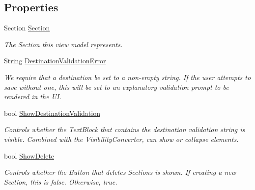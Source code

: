 \subsection*{Properties}
\begin{DoxyCompactItemize}
\item 
Section \mbox{\hyperlink{class_listen_to_me_1_1_view_model_1_1_section_view_model_ac1ac47e03f46b5fe9945f66cfbb03fa7}{Section}}
\begin{DoxyCompactList}\small\item\em The Section this view model represents. \end{DoxyCompactList}\item 
String \mbox{\hyperlink{class_listen_to_me_1_1_view_model_1_1_section_view_model_a6cd72ba0cad2236b996d642a70b22bfa}{Destination\+Validation\+Error}}
\begin{DoxyCompactList}\small\item\em We require that a destination be set to a non-\/empty string. If the user attempts to save without one, this will be set to an explanatory validation prompt to be rendered in the UI. \end{DoxyCompactList}\item 
bool \mbox{\hyperlink{class_listen_to_me_1_1_view_model_1_1_section_view_model_a82a97f1530d04dd2f88d29b886cc6593}{Show\+Destination\+Validation}}
\begin{DoxyCompactList}\small\item\em Controls whether the Text\+Block that contains the destination validation string is visible. Combined with the Visibility\+Converter, can show or collapse elements. \end{DoxyCompactList}\item 
bool \mbox{\hyperlink{class_listen_to_me_1_1_view_model_1_1_section_view_model_a24849a3722acd4b1d7d3bf227af05674}{Show\+Delete}}
\begin{DoxyCompactList}\small\item\em Controls whether the Button that deletes Sections is shown. If creating a new Section, this is false. Otherwise, true. \end{DoxyCompactList}\end{DoxyCompactItemize}

